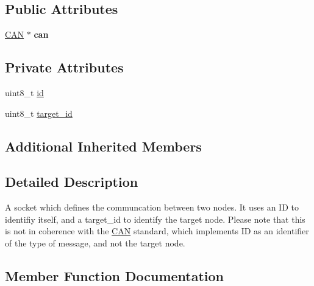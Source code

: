 \subsection*{Public Attributes}
\begin{DoxyCompactItemize}
\item 
\hyperlink{class_c_a_n}{C\+AN} $\ast$ {\bfseries can}\hypertarget{class_s_o_c_k_e_t_a40e1973f231f6e5c51f02bfb8e7c0722}{}\label{class_s_o_c_k_e_t_a40e1973f231f6e5c51f02bfb8e7c0722}

\end{DoxyCompactItemize}
\subsection*{Private Attributes}
\begin{DoxyCompactItemize}
\item 
uint8\+\_\+t \hyperlink{class_s_o_c_k_e_t_a0755fe74751c2d94d3d1679cad9e6544}{id}
\item 
uint8\+\_\+t \hyperlink{class_s_o_c_k_e_t_a566ef7ae1ca5366f622bbe805954a031}{target\+\_\+id}
\end{DoxyCompactItemize}
\subsection*{Additional Inherited Members}


\subsection{Detailed Description}
A socket which defines the communcation between two nodes. It uses an ID to identifiy itself, and a target\+\_\+id to identify the target node. Please note that this is not in coherence with the \hyperlink{class_c_a_n}{C\+AN} standard, which implements ID as an identifier of the type of message, and not the target node. 

\subsection{Member Function Documentation}
